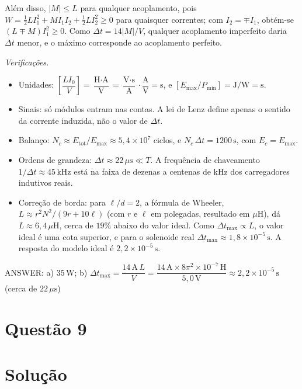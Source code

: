 \documentclass{article}%
\begin{document}
Além disso, $|M| \le L$ para qualquer acoplamento, pois $W = \tfrac12 L I_1^2 + M I_1 I_2 + \tfrac12 L I_2^2 \ge 0$ para quaisquer correntes; com $I_2 = \mp I_1$, obtém-se $(L \mp M) I_1^2 \ge 0$. Como $\Delta t = 14|M|/V$, qualquer acoplamento imperfeito daria $\Delta t$ menor, e o máximo corresponde ao acoplamento perfeito.

\textit{Verificações.}
\begin{itemize}
\item Unidades: $\left[\dfrac{LI_0}{V}\right] = \dfrac{\text{H}\cdot\text{A}}{\text{V}} = \dfrac{\text{V}\cdot\text{s}}{\text{A}}\cdot\dfrac{\text{A}}{\text{V}} = \text{s}$, e $[E_{\max}/P_{\min}] = \text{J}/\text{W} = \text{s}$.
\item Sinais: só módulos entram nas contas. A lei de Lenz define apenas o sentido da corrente induzida, não o valor de $\Delta t$.
\item Balanço: $N_c \approx E_{\text{tot}}/E_{\max} \approx 5{,}4\times10^{7}$ ciclos, e $N_c\,\Delta t = 1200\,\text{s}$, com $E_c = E_{\max}$.
\item Ordens de grandeza: $\Delta t \approx 22\,\mu\text{s} \ll T$. A frequência de chaveamento $1/\Delta t \approx 45\,\text{kHz}$ está na faixa de dezenas a centenas de kHz dos carregadores indutivos reais.
\item Correção de borda: para $\ell/d = 2$, a fórmula de Wheeler, $L \approx r^2N^2/(9r + 10\ell)$ (com $r$ e $\ell$ em polegadas, resultado em $\mu\text{H}$), dá $L \approx 6{,}4\,\mu\text{H}$, cerca de $19\%$ abaixo do valor ideal. Como $\Delta t_{\max} \propto L$, o valor ideal é uma cota superior, e para o solenoide real $\Delta t_{\max} \approx 1{,}8\times10^{-5}\,\text{s}$. A resposta do modelo ideal é $2{,}2\times10^{-5}\,\text{s}$.
\end{itemize}

ANSWER: a) $35\,\text{W}$; b) $\Delta t_{\max} = \dfrac{14\,\text{A}\,L}{V} = \dfrac{14\,\text{A}\times8\pi^2\times10^{-7}\,\text{H}}{5{,}0\,\text{V}} \approx 2{,}2\times10^{-5}\,\text{s}$ (cerca de $22\,\mu\text{s}$)%
\newpage%
\section*{Questão 9}

\section*{Solução}
\end{document}
